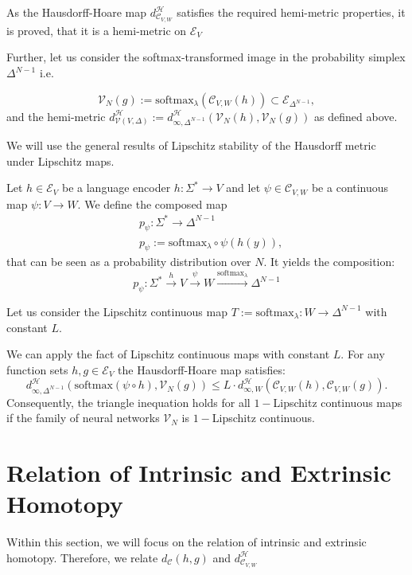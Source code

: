 As the Hausdorff-Hoare map $d_{\mathcal{C}_{V,W}}^\mathcal{H}$ satisfies the required hemi-metric properties, it is proved, that it is a hemi-metric on $\mathcal{E}_V$

Further, let us consider the softmax-transformed image in the probability simplex $\Delta^{N-1}$ i.e.

\[\mathcal{V}_N(g) := \text{softmax}_\lambda(\mathcal{C}_{V,W}(h)) \subset \mathcal{E}_{\Delta^{N-1}},\]
and the hemi-metric $d^\mathcal{H}_{\mathcal{V}(V,\Delta)}:= d^\mathcal{H}_{\infty,\Delta^{N-1}}(\mathcal{V}_N(h),\mathcal{V}_N(g))$ as defined above.

We will use the general results of Lipschitz stability of the Hausdorff metric under Lipschitz maps.


Let $h\in\mathcal{E}_V$ be a language encoder $h:\Sigma^*\to V$ and let $\psi\in\mathcal{C}_{V,W}$ be a continuous map $\psi: V \to W$.
We define the composed map
\begin{align*}
    &p_\psi:\Sigma^*\to \Delta^{N-1}\\
    &p_\psi:=\text{softmax}_\lambda\circ \psi(h(y)),
\end{align*}
that can be seen as a probability distribution over $N$. 
It yields the composition:
\[p_\psi:\Sigma^*\xrightarrow{h} V \xrightarrow{\psi} W \xrightarrow{\text{softmax}_\lambda} \Delta^{N-1}\]

Let us consider the Lipschitz continuous map $T:= \text{softmax}_\lambda:W \to \Delta^{N-1}$ with constant $L$.

We can apply the fact of Lipschitz continuous maps with constant $L$.
For any function sets $h,g \in \mathcal{E}_V$ the Hausdorff-Hoare map satisfies:
\[d_{\infty,\Delta^{N-1}}^\mathcal{H}(\text{softmax}(\psi\circ h), \mathcal{V}_N(g))\leq L\cdot d_{\infty, W}^\mathcal{H}(\mathcal{C}_{V,W}(h),\mathcal{C}_{V,W}(g)).\]
Consequently, the triangle inequation holds for all $1-$Lipschitz continuous maps if the family of neural networks $\mathcal{V}_N$ is $1-$Lipschitz continuous.





\section{Relation of Intrinsic and Extrinsic Homotopy}
Within this section, we will focus on the relation of intrinsic and extrinsic homotopy.
Therefore, we relate $d_\mathcal{C}(h,g)$ and $d_{\mathcal{C}_{V,W}}^\mathcal{H}$
